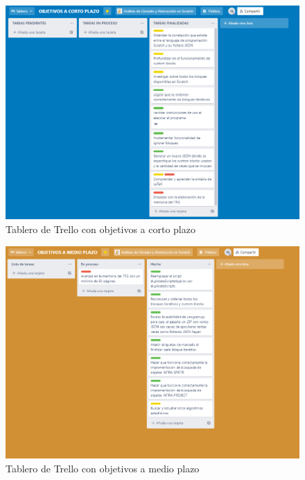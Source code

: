 \documentclass[a4paper, 12pt]{book}
\begin{document}
 \begin{figure}[h]
 	 \centering
    \includegraphics[width=15cm, keepaspectratio]{img/obj_cortoplazo.png}
    \caption{Tablero de Trello con objetivos a corto plazo}
    \label{fig:tableros_trello}
 \end{figure}

 \begin{figure}[h]
  	 \centering
    \includegraphics[width=15cm, keepaspectratio]{img/obj_medioplazo.png}
    \caption{Tablero de Trello con objetivos a medio plazo}
    \label{fig:tableros_trello}
 \end{figure}
 
\end{document}
